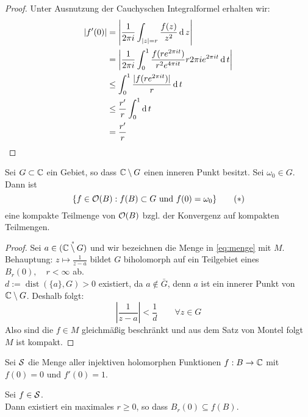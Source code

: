 \begin{proof}
  Unter Ausnutzung der Cauchyschen Integralformel erhalten wir:
  \begin{align*}
    |f'(0)| & = \left | \frac{1}{2\pi i} \int_{|z| = r} \frac{f(z)}{z^2}
      \d[z] \right | \\
    & = \left | \frac{1}{2 \pi i} \int_0^1 \frac{f(r e^{2\pi it})}{r^2
        e^{4\pi i t}} r 2\pi i e^{2\pi i t} \d[t] \right | \\
    & \leq \int_0^1 \frac{|f(r e^{2\pi it})|}{r} \d[t] \\
    & \leq \frac{r'}{r} \int_0^1 \d[t] \\
    & = \frac{r'}{r}
  \end{align*}
\end{proof}

\begin{lemma}
  \label{lemma:funktion-kompakt}
  Sei $G \subset \C$ ein Gebiet, so dass $\C\setminus G$ einen inneren
  Punkt besitzt. Sei $\omega_0 \in G$. Dann ist
  \[
  \{f \in \hol(B): f(B) \subset G \text{ und } f(0) = \omega_0
  \} \label{eq:menge} \tag{$\ast$}
  \]
  eine kompakte Teilmenge von $\hol(B)$ bzgl. der Konvergenz auf
  kompakten Teilmengen.
\end{lemma}

\begin{proof}
  Sei $a  \in \mathring{(\C \setminus G)}$ und wir bezeichnen die
  Menge in  \eqref{eq:menge} mit $M$.\\
  Behauptung: $z \mapsto \frac{1}{z-a}$
  bildet $G$ biholomorph auf ein Teilgebiet eines $B_r(0), \quad r <
  \infty$ ab.\\
  $d:= \operatorname{dist}(\{a\},G)> 0$ existiert, da $a \notin \bar
  G$, denn $a$ ist ein innerer Punkt von $\C \setminus G$. Deshalb
  folgt:
  \[
  \left | \frac{1}{z-a} \right |< \frac1d \qquad \forall z \in G
  \]
  Also sind die $f \in M$ gleichmäßig beschränkt und aus dem Satz von
  Montel folgt $M$ ist kompakt.
\end{proof}

\begin{defin}
  Sei $\S$\index{$\S$} die Menge aller injektiven holomorphen Funktionen $f: B \ra
  \C$ mit $f(0) = 0$ und $f'(0)= 1$.
\end{defin}

\begin{lemma}
  \label{lemma:schlicht-max-rad}
  Sei $f \in \S$. \\
  Dann existiert ein maximales $r \geq 0$, so dass $B_r(0) \subseteq
  f(B)$.
\end{lemma}

